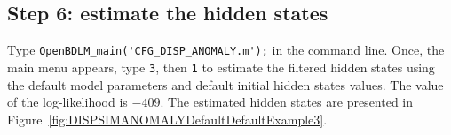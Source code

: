 \subsection{Step 6: estimate the hidden states}

Type \colorbox{light-gray}{\lstinline[basicstyle = \mlttfamily \small, backgroundcolor = \color{light-gray}]!OpenBDLM_main('CFG_DISP_ANOMALY.m');!} in the \MATLAB{} command line.
Once, the main menu appears, type  \colorbox{light-gray}{\lstinline[basicstyle = \mlttfamily \small, backgroundcolor = \color{light-gray}]!3!}, then \colorbox{light-gray}{\lstinline[basicstyle = \mlttfamily \small, backgroundcolor = \color{light-gray}]!1!} to estimate the filtered hidden states using the default model parameters and default initial hidden states values.
The value of the log-likelihood is $-409$.
The estimated hidden states are presented in Figure~\ref{fig:DISPSIMANOMALYDefaultDefaultExample3}.

